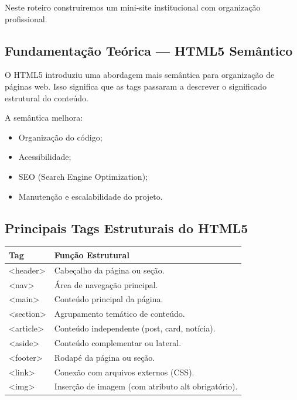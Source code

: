 \documentclass[12pt,a4paper]{article}
\begin{document}
Neste roteiro construiremos um mini-site institucional com organização profissional.


\subsection{Fundamentação Teórica — HTML5 Semântico}

O HTML5 introduziu uma abordagem mais semântica para organização de páginas web.  
Isso significa que as tags passaram a descrever o significado estrutural do conteúdo.

A semântica melhora:

\begin{itemize}
\item Organização do código;
\item Acessibilidade;
\item SEO (Search Engine Optimization);
\item Manutenção e escalabilidade do projeto.
\end{itemize}

\subsection{Principais Tags Estruturais do HTML5}

\begin{boxTabela}
\begin{tabular}{|p{3.5cm}|p{12.5cm}|}
\hline
\rowcolor{pretoTabela}
\color{white}\textbf{Tag} &
\color{white}\textbf{Função Estrutural} \\
\hline

<header> & Cabeçalho da página ou seção. \\
\hline
<nav> & Área de navegação principal. \\
\hline
<main> & Conteúdo principal da página. \\
\hline
<section> & Agrupamento temático de conteúdo. \\
\hline
<article> & Conteúdo independente (post, card, notícia). \\
\hline
<aside> & Conteúdo complementar ou lateral. \\
\hline
<footer> & Rodapé da página ou seção. \\
\hline
<link> & Conexão com arquivos externos (CSS). \\
\hline
<img> & Inserção de imagem (com atributo alt obrigatório). \\
\hline
\end{tabular}
\end{boxTabela}
\end{document}
